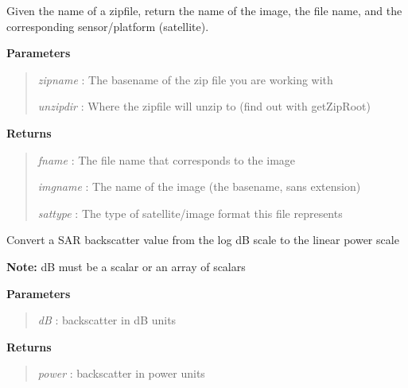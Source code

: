 \documentclass[letterpaper,10pt,openany,oneside]{sphinxmanual}
\begin{document}
\begin{fulllineitems}
\label{code:Util.getFilename}
Given the name of a zipfile, return the name of the image,
the file name, and the corresponding sensor/platform (satellite).

\textbf{Parameters}
\begin{quote}

\emph{zipname}  : The basename of the zip file you are working with

\emph{unzipdir} : Where the zipfile will unzip to (find out with getZipRoot)
\end{quote}

\textbf{Returns}
\begin{quote}

\emph{fname}    :  The file name that corresponds to the image

\emph{imgname}  : The name of the image (the basename, sans extension)

\emph{sattype}  : The type of satellite/image format this file represents
\end{quote}

\end{fulllineitems}


\begin{fulllineitems}
\label{code:Util.getPowerScale}
Convert a SAR backscatter value from the log dB scale to the linear power scale

\textbf{Note:} dB must be a scalar or an array of scalars

\textbf{Parameters}
\begin{quote}

\emph{dB}    : backscatter in dB units
\end{quote}

\textbf{Returns}
\begin{quote}

\emph{power} : backscatter in power units
\end{quote}

\end{fulllineitems}

\end{document}
